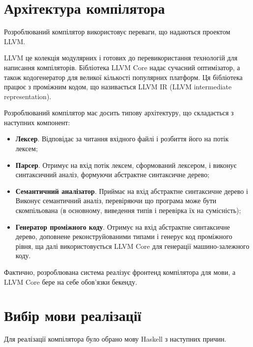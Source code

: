 \documentclass[main.tex]{subfiles}
\begin{document}
\section{Архітектура компілятора}
Розроблюваний компілятор використовує переваги, що надаються проектом LLVM.

LLVM це колекція модулярних і готових до перевикористання технологій для написання компіляторів.
Бібліотека LLVM Core надає сучасний оптимізатор, а також кодогенератор для великої кількості популярних платформ.
Ця бібліотека працює з проміжним кодом, що називається LLVM IR (LLVM intermediate representation).

Розроблюваний компілятор має досить типову архітектуру, що складається з наступних компонент:
\begin{itemize}
\item \textbf{Лексер}. Відповідає за читання вхідного файлі і розбиття його на потік лексем;
\item \textbf{Парсер}. Отримує на вхід потік лексем, сформований лексером, і виконує синтаксичний аналіз, формуючи абстрактне синтаксичне дерево;
\item \textbf{Семантичний аналізатор}. Приймає на вхід абстрактне синтаксичне дерево і Виконує семантичний аналіз, перевіряючи що програма може бути скомпільована (в основному, виведення типів і перевірка їх на сумісність);
\item \textbf{Генератор проміжного коду}. Отримує на вхід абстрактне синтаксичне дерево, доповнене реконструйованими типами і генерує код проміжного рівня, ща далі використовується LLVM Core для генерації машино-залежного коду.
\end{itemize}

Фактично, розроблювана система реалізує фронтенд компілятора для мови, а LLVM Core бере на себе обов'язки бекенду.

\section{Вибір мови реалізації}
Для реалізації компілятора було обрано мову Haskell з наступних причин.
\end{document}

